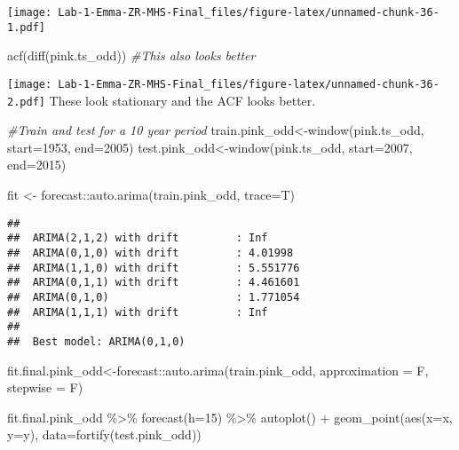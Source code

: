 \documentclass[
]{article}
\newenvironment{Shaded}{\begin{snugshade}}{\end{snugshade}}
\newcommand{\AttributeTok}[1]{\textcolor[rgb]{0.77,0.63,0.00}{#1}}
\newcommand{\CommentTok}[1]{\textcolor[rgb]{0.56,0.35,0.01}{\textit{#1}}}
\newcommand{\DecValTok}[1]{\textcolor[rgb]{0.00,0.00,0.81}{#1}}
\newcommand{\FunctionTok}[1]{\textcolor[rgb]{0.00,0.00,0.00}{#1}}
\newcommand{\NormalTok}[1]{#1}
\newcommand{\OtherTok}[1]{\textcolor[rgb]{0.56,0.35,0.01}{#1}}
\newcommand{\SpecialCharTok}[1]{\textcolor[rgb]{0.00,0.00,0.00}{#1}}
\begin{document}
\texttt{[image: Lab-1-Emma-ZR-MHS-Final\_files/figure-latex/unnamed-chunk-36-1.pdf]}

\begin{Shaded}
\begin{Highlighting}[]
\FunctionTok{acf}\NormalTok{(}\FunctionTok{diff}\NormalTok{(pink.ts\_odd)) }\CommentTok{\#This also looks better}
\end{Highlighting}
\end{Shaded}

\texttt{[image: Lab-1-Emma-ZR-MHS-Final\_files/figure-latex/unnamed-chunk-36-2.pdf]}
These look stationary and the ACF looks better.

\begin{Shaded}
\begin{Highlighting}[]
\CommentTok{\#Train and test for a 10 year period}
\NormalTok{train.pink\_odd}\OtherTok{\textless{}{-}}\FunctionTok{window}\NormalTok{(pink.ts\_odd, }\AttributeTok{start=}\DecValTok{1953}\NormalTok{, }\AttributeTok{end=}\DecValTok{2005}\NormalTok{)}
\NormalTok{test.pink\_odd}\OtherTok{\textless{}{-}}\FunctionTok{window}\NormalTok{(pink.ts\_odd, }\AttributeTok{start=}\DecValTok{2007}\NormalTok{, }\AttributeTok{end=}\DecValTok{2015}\NormalTok{)}

\NormalTok{fit }\OtherTok{\textless{}{-}}\NormalTok{ forecast}\SpecialCharTok{::}\FunctionTok{auto.arima}\NormalTok{(train.pink\_odd, }\AttributeTok{trace=}\NormalTok{T)}
\end{Highlighting}
\end{Shaded}

\begin{verbatim}
## 
##  ARIMA(2,1,2) with drift         : Inf
##  ARIMA(0,1,0) with drift         : 4.01998
##  ARIMA(1,1,0) with drift         : 5.551776
##  ARIMA(0,1,1) with drift         : 4.461601
##  ARIMA(0,1,0)                    : 1.771054
##  ARIMA(1,1,1) with drift         : Inf
## 
##  Best model: ARIMA(0,1,0)
\end{verbatim}

\begin{Shaded}
\begin{Highlighting}[]
\NormalTok{fit.final.pink\_odd}\OtherTok{\textless{}{-}}\NormalTok{forecast}\SpecialCharTok{::}\FunctionTok{auto.arima}\NormalTok{(train.pink\_odd, }\AttributeTok{approximation =}\NormalTok{ F, }\AttributeTok{stepwise =}\NormalTok{ F)}

\NormalTok{fit.final.pink\_odd }\SpecialCharTok{\%\textgreater{}\%}
  \FunctionTok{forecast}\NormalTok{(}\AttributeTok{h=}\DecValTok{15}\NormalTok{) }\SpecialCharTok{\%\textgreater{}\%}
  \FunctionTok{autoplot}\NormalTok{() }\SpecialCharTok{+} \FunctionTok{geom\_point}\NormalTok{(}\FunctionTok{aes}\NormalTok{(}\AttributeTok{x=}\NormalTok{x, }\AttributeTok{y=}\NormalTok{y), }\AttributeTok{data=}\FunctionTok{fortify}\NormalTok{(test.pink\_odd))}
\end{Highlighting}
\end{Shaded}
\end{document}
